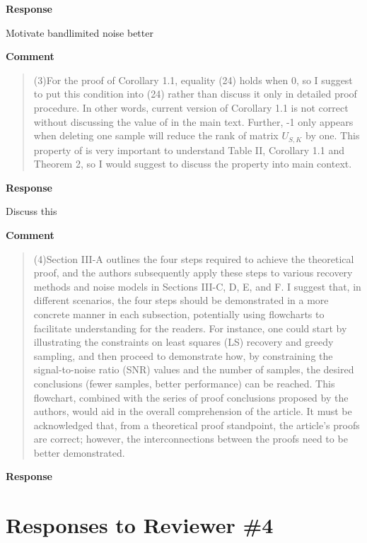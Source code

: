\documentclass[11pt,onecolumn,journal]{IEEEtran}
\begin{document}
\textbf{Response}
\begin{todolist}
\item Motivate bandlimited noise better
    
\end{todolist}

\textbf{Comment}
\begin{quote}
(3)For the proof of Corollary 1.1, equality (24) holds when 0, so I suggest to put this condition into (24) rather than discuss it only in detailed proof procedure. In other words, current version of Corollary 1.1 is not correct without discussing the value of  in the main text. Further, -1 only appears when deleting one sample will reduce the rank of matrix $U_{S,K}$ by one. This property of is very important to understand Table II, Corollary 1.1 and Theorem 2, so I would suggest to discuss the property into main context.
\end{quote}

\textbf{Response}
\begin{todolist}
    \item Discuss this
\end{todolist}

\textbf{Comment}
\begin{quote}
(4)Section III-A outlines the four steps required to achieve the theoretical proof, and the authors subsequently apply these steps to various recovery methods and noise models in Sections III-C, D, E, and F. I suggest that, in different scenarios, the four steps should be demonstrated in a more concrete manner in each subsection, potentially using flowcharts to facilitate understanding for the readers. For instance, one could start by illustrating the constraints on least squares (LS) recovery and greedy sampling, and then proceed to demonstrate how, by constraining the signal-to-noise ratio (SNR) values and the number of samples, the desired conclusions (fewer samples, better performance) can be reached. This flowchart, combined with the series of proof conclusions proposed by the authors, would aid in the overall comprehension of the article. It must be acknowledged that, from a theoretical proof standpoint, the article's proofs are correct; however, the interconnections between the proofs need to be better demonstrated.

\end{quote}

\textbf{Response}


\section*{Responses to Reviewer \#4}
\end{document}
